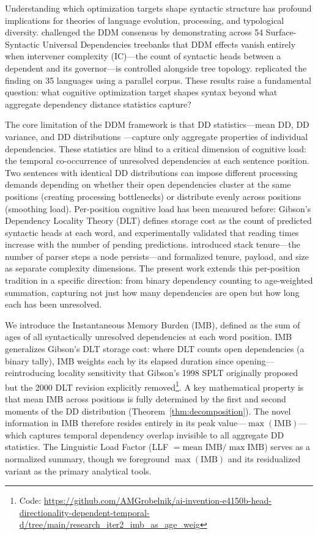 \documentclass[11pt,letterpaper]{article}
\begin{document}
Understanding which optimization targets shape syntactic structure has profound implications for theories of language evolution, processing, and typological diversity. \citet{Yadav2022} challenged the DDM consensus by demonstrating across 54 Surface-Syntactic Universal Dependencies treebanks that DDM effects vanish entirely when intervener complexity (IC)---the count of syntactic heads between a dependent and its governor---is controlled alongside tree topology. \citet{Dyer2023} replicated the finding on 35 languages using a parallel corpus. These results raise a fundamental question: what cognitive optimization target shapes syntax beyond what aggregate dependency distance statistics capture?

The core limitation of the DDM framework is that DD statistics---mean DD, DD variance, and DD distributions \citep{Petrini2022}---capture only aggregate properties of individual dependencies. These statistics are blind to a critical dimension of cognitive load: the temporal co-occurrence of unresolved dependencies at each sentence position. Two sentences with identical DD distributions can impose different processing demands depending on whether their open dependencies cluster at the same positions (creating processing bottlenecks) or distribute evenly across positions (smoothing load). Per-position cognitive load has been measured before: Gibson's Dependency Locality Theory (DLT) \citep{Gibson1998, Gibson2000} defines storage cost as the count of predicted syntactic heads at each word, and \citet{Chen2005} experimentally validated that reading times increase with the number of pending predictions. \citet{Kobele2013} introduced stack tenure---the number of parser steps a node persists---and \citet{Graf2017} formalized tenure, payload, and size as separate complexity dimensions. The present work extends this per-position tradition in a specific direction: from binary dependency counting to age-weighted summation, capturing not just how many dependencies are open but how long each has been unresolved.

We introduce the Instantaneous Memory Burden (IMB), defined as the sum of ages of all syntactically unresolved dependencies at each word position. IMB generalizes Gibson's DLT storage cost: where DLT counts open dependencies (a binary tally), IMB weights each by its elapsed duration since opening---reintroducing locality sensitivity that Gibson's 1998 SPLT originally proposed but the 2000 DLT revision explicitly removed\footnote{Code: \url{https://github.com/AMGrobelnik/ai-invention-e4150b-head-directionality-dependent-temporal-d/tree/main/research_iter2_imb_as_age_weig}}. A key mathematical property is that mean IMB across positions is fully determined by the first and second moments of the DD distribution (Theorem~\ref{thm:decomposition}). The novel information in IMB therefore resides entirely in its peak value---$\max(\text{IMB})$---which captures temporal dependency overlap invisible to all aggregate DD statistics. The Linguistic Load Factor (LLF $= \text{mean IMB} / \max \text{IMB}$) serves as a normalized summary, though we foreground $\max(\text{IMB})$ and its residualized variant as the primary analytical tools.
\end{document}
